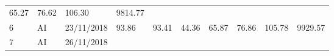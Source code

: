 \documentclass[
  11pt,
]{article}
\begin{document}
\begin{longtable}[]{@{}llllllllll@{}}
\begin{minipage}[t]{0.07\columnwidth}
65.27\strut
\end{minipage} & \begin{minipage}[t]{0.07\columnwidth}\raggedright
76.62\strut
\end{minipage} & \begin{minipage}[t]{0.08\columnwidth}\raggedright
106.30\strut
\end{minipage} & \begin{minipage}[t]{0.09\columnwidth}\raggedright
9814.77\strut
\end{minipage}\tabularnewline
\begin{minipage}[t]{0.05\columnwidth}\raggedright
6\strut
\end{minipage} & \begin{minipage}[t]{0.07\columnwidth}\raggedright
AI\strut
\end{minipage} & \begin{minipage}[t]{0.11\columnwidth}\raggedright
23/11/2018\strut
\end{minipage} & \begin{minipage}[t]{0.07\columnwidth}\raggedright
93.86\strut
\end{minipage} & \begin{minipage}[t]{0.07\columnwidth}\raggedright
93.41\strut
\end{minipage} & \begin{minipage}[t]{0.07\columnwidth}\raggedright
44.36\strut
\end{minipage} & \begin{minipage}[t]{0.07\columnwidth}\raggedright
65.87\strut
\end{minipage} & \begin{minipage}[t]{0.07\columnwidth}\raggedright
76.86\strut
\end{minipage} & \begin{minipage}[t]{0.08\columnwidth}\raggedright
105.78\strut
\end{minipage} & \begin{minipage}[t]{0.09\columnwidth}\raggedright
9929.57\strut
\end{minipage}\tabularnewline
\begin{minipage}[t]{0.05\columnwidth}\raggedright
7\strut
\end{minipage} & \begin{minipage}[t]{0.07\columnwidth}\raggedright
AI\strut
\end{minipage} & \begin{minipage}[t]{0.11\columnwidth}\raggedright
26/11/2018\strut
\end{minipage} & \begin{minipage}[t]{0.07\columnwidth}\raggedright

\end{minipage}
\end{longtable}
\end{document}
